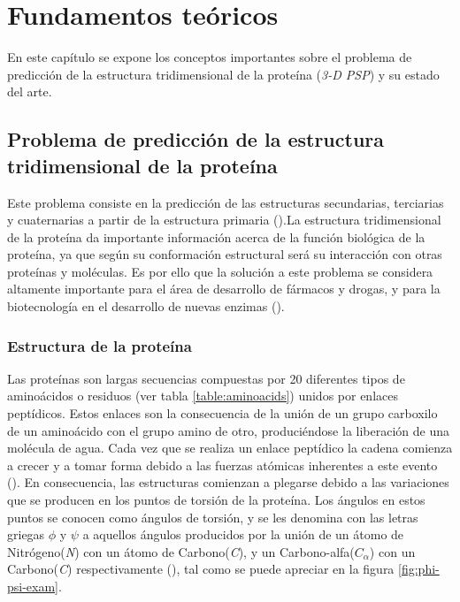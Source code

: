 \chapter{Fundamentos te\'oricos}
\label{cap:fundamentos}

En este capítulo se expone los conceptos importantes sobre el problema de predicción de la estructura tridimensional de la proteína (\textit{3-D PSP}) y su  estado del arte. 

\section{Problema de predicción de la estructura tridimensional de la proteína}

Este problema consiste en la predicción de las estructuras secundarias, terciarias y cuaternarias a partir de la estructura primaria (\citealp{Anfinsen:1973}).La estructura tridimensional de la proteína da importante información acerca de la función biológica de la proteína, ya que según su conformación estructural será su interacción con otras proteínas y moléculas. Es por ello que la solución a este problema se considera altamente importante para el área de desarrollo de fármacos y drogas, y para la biotecnología en el desarrollo de nuevas enzimas (\citealp{Cohen19961}).

\subsection{Estructura de la proteína}

Las proteínas son largas secuencias compuestas por 20 diferentes tipos de aminoácidos o residuos (ver tabla \ref{table:aminoacids}) unidos por enlaces peptídicos. Estos enlaces son la consecuencia de la unión de un grupo carboxilo de un aminoácido con el grupo amino de otro, produciéndose la liberación de una molécula de agua. Cada vez que se realiza un enlace peptídico la cadena comienza a crecer y a tomar forma debido a las fuerzas atómicas inherentes a este evento (\citealp{Anfinsen:1972}). En consecuencia, las estructuras comienzan a plegarse debido a las variaciones que se producen en los puntos de torsión de la proteína. Los ángulos en estos puntos se conocen como ángulos de torsión, y se les denomina con las letras griegas $\phi$ y $\psi$ a aquellos ángulos producidos por la unión de un átomo de Nitrógeno(\textit{N}) con un átomo de Carbono(\textit{C}), y un Carbono-alfa($C_{\alpha}$) con un Carbono(\textit{C}) respectivamente (\citealp{Anfinsen:1973}), tal como se puede apreciar en la figura \ref{fig:phi-psi-exam}.

